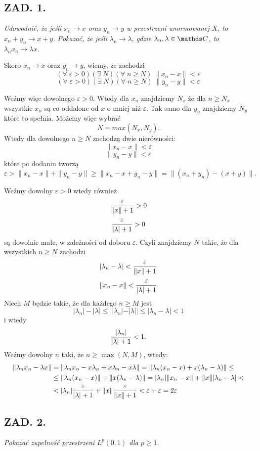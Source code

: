 \documentclass{article}
\begin{document}
    \subsection*{ZAD. 1.}

    \emph{Udowodnić, że jeśli $x_n\to x$ oraz $y_n\to y$ w przestrzeni unormowanej $X$, to $x_n+y_n\to x+y$. Pokazać, że jeśli $\lambda_n\to \lambda$, gdzie $\lambda_n, \lambda\in\C$, to $\lambda_nx_n\to\lambda x$.}

    Skoro $x_n\to x$ oraz $y_n\to y$, wiemy, że zachodzi
    $$(\forall\;\varepsilon>0)(\exists\;N)(\forall\;n\geq N)\;\|x_n-x\|<\varepsilon$$
    $$(\forall\;\varepsilon>0)(\exists\;N)(\forall\;n\geq N)\;\|y_n-y\|<\varepsilon$$

    Weźmy więc dowolnego $\varepsilon>0$. Wtedy dla $x_n$ znajdziemy $N_x$ że dla $n\geq N_x$ wszystkie $x_n$ są co oddalone od $x$ o mniej niż $\varepsilon$. Tak samo dla $y_n$ znajdziemy $N_y$ które to spełnia. Możemy więc wybrać 
    $$N=max(N_x, N_y).$$
    Wtedy dla dowolnego $n\geq N$ zachodzą dwie nierówności:
    $$\|x_n-x\|<\varepsilon$$
    $$\|y_n-y\|<\varepsilon$$
    które po dodaniu tworzą
    $$\varepsilon>\|x_n-x\|+\|y_n-y\|\geq\|x_n-x+y_n-y\|=\|(x_n+y_n)-(x+y)\|.$$


    Weźmy dowolny $\varepsilon>0$ wtedy również
    $${\varepsilon\over \|x\|+1}>0$$
    $${\varepsilon\over |\lambda|+1}>0$$
    są dowolnie małe, w zależności od doboru $\varepsilon$. Czyli znajdziemy $N$ takie, że dla wszystkich $n\geq N$ zachodzi
    $$|\lambda_n-\lambda|<{\varepsilon\over \|x\|+1}$$
    $$\|x_n-x\|<{\varepsilon\over |\lambda|+1 }$$
    Niech $M$ będzie takie, że dla każdego $n\geq M$ jest
    $$|\lambda_n|-|\lambda|\leq||\lambda_n|-|\lambda||\leq|\lambda_n-\lambda|<1$$
    i wtedy
    $${|\lambda_n|\over |\lambda|+1}<1.$$
    Weźmy dowolny $n$ taki, że $n\geq\max(N, M)$, wtedy:
    \begin{align*}
    \|\lambda_nx_n-\lambda x\|&=\|\lambda_nx_n-x\lambda_n+x\lambda_n-x\lambda\|=\|\lambda_n(x_n-x)+x(\lambda_n-\lambda)\|\leq\\
    &\leq\|\lambda_n(x_n-x)\|+\|x(\lambda_n-\lambda)\|=|\lambda_n|\|x_n-x\|+\|x\||\lambda_n-\lambda|<\\
    &<|\lambda_n|{\varepsilon\over |\lambda|+1}+\|x\|{\varepsilon\over \|x\|+1}<\varepsilon+\varepsilon=2\varepsilon
    \end{align*}

\subsection*{ZAD. 2.}
\emph{Pokazać zupełność przestrzeni $L^p(0, 1)$ dla $p\geq 1$.}
\smallskip
\end{document}
